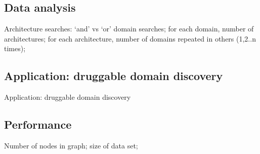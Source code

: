 \subsection{Data analysis}
Architecture searches: `and' vs `or' domain searches; for each domain, number of architectures; for each architecture, number of domains repeated in others (1,2..n times);

\subsection{Application: druggable domain discovery}
Application: druggable domain discovery

\subsection{Performance}
Number of nodes in graph; size of data set;


